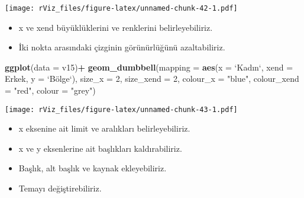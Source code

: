 \documentclass[
]{book}
\newenvironment{Shaded}{\begin{snugshade}}{\end{snugshade}}
\newcommand{\DataTypeTok}[1]{\textcolor[rgb]{0.13,0.29,0.53}{#1}}
\newcommand{\DecValTok}[1]{\textcolor[rgb]{0.00,0.00,0.81}{#1}}
\newcommand{\KeywordTok}[1]{\textcolor[rgb]{0.13,0.29,0.53}{\textbf{#1}}}
\newcommand{\NormalTok}[1]{#1}
\newcommand{\OperatorTok}[1]{\textcolor[rgb]{0.81,0.36,0.00}{\textbf{#1}}}
\newcommand{\StringTok}[1]{\textcolor[rgb]{0.31,0.60,0.02}{#1}}
\begin{document}
\texttt{[image: rViz\_files/figure-latex/unnamed-chunk-42-1.pdf]}

\begin{itemize}
\item
  x ve xend büyüklüklerini ve renklerini belirleyebiliriz.
\item
  İki nokta arasındaki çizginin görünürlüğünü azaltabiliriz.
\end{itemize}

\begin{Shaded}
\begin{Highlighting}[]
\KeywordTok{ggplot}\NormalTok{(}\DataTypeTok{data =}\NormalTok{ v15)}\OperatorTok{+}
\StringTok{  }\KeywordTok{geom_dumbbell}\NormalTok{(}\DataTypeTok{mapping =} \KeywordTok{aes}\NormalTok{(}\DataTypeTok{x =} \StringTok{`}\DataTypeTok{Kadın}\StringTok{`}\NormalTok{, }\DataTypeTok{xend =}\NormalTok{ Erkek, }\DataTypeTok{y =} \StringTok{`}\DataTypeTok{Bölge}\StringTok{`}\NormalTok{),}
                \DataTypeTok{size_x =} \DecValTok{2}\NormalTok{, }\DataTypeTok{size_xend =} \DecValTok{2}\NormalTok{,}
                \DataTypeTok{colour_x =} \StringTok{"blue"}\NormalTok{, }\DataTypeTok{colour_xend =} \StringTok{"red"}\NormalTok{,}
                \DataTypeTok{colour =} \StringTok{"grey"}\NormalTok{)}
\end{Highlighting}
\end{Shaded}

\texttt{[image: rViz\_files/figure-latex/unnamed-chunk-43-1.pdf]}

\begin{itemize}
\item
  x eksenine ait limit ve aralıkları belirleyebiliriz.
\item
  x ve y eksenlerine ait başlıkları kaldırabiliriz.
\item
  Başlık, alt başlık ve kaynak ekleyebiliriz.
\item
  Temayı değiştirebiliriz.
\end{itemize}
\end{document}
